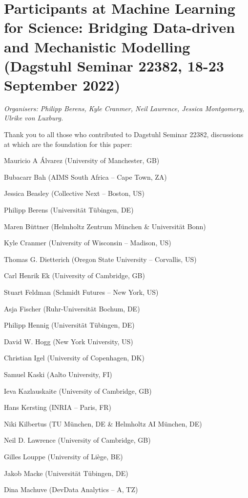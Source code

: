 \section{Participants at Machine Learning for Science: Bridging
Data-driven and Mechanistic Modelling (Dagstuhl Seminar 22382, 18-23
September
2022)}\label{annex-1-participants-at-machine-learning-for-science-bridging-data-driven-and-mechanistic-modelling-dagstuhl-seminar-22382-18-23-september-2022}

\emph{Organisers: Philipp Berens, Kyle Cranmer, Neil Lawrence, Jessica
Montgomery, Ulrike von Luxburg.}

Thank you to all those who contributed to Dagstuhl Seminar 22382,
discussions at which are the foundation for this paper:

Mauricio A Álvarez (University of Manchester, GB)

Bubacarr Bah (AIMS South Africa -- Cape Town, ZA)

Jessica Beasley (Collective Next -- Boston, US)

Philipp Berens (Universität Tübingen, DE)

Maren Büttner (Helmholtz Zentrum München \& Universität Bonn)

Kyle Cranmer (University of Wisconsin -- Madison, US)

Thomas G. Dietterich (Oregon State University -- Corvallis, US)

Carl Henrik Ek (University of Cambridge, GB)

Stuart Feldman (Schmidt Futures -- New York, US)

Asja Fischer (Ruhr-Universität Bochum, DE)

Philipp Hennig (Universität Tübingen, DE)

David W. Hogg (New York University, US)

Christian Igel (University of Copenhagen, DK)

Samuel Kaski (Aalto University, FI)

Ieva Kazlauskaite (University of Cambridge, GB)

Hans Kersting (INRIA -- Paris, FR)

Niki Kilbertus (TU München, DE \& Helmholtz AI München, DE)

Neil D. Lawrence (University of Cambridge, GB)

Gilles Louppe (University of Liège, BE)

Jakob Macke (Universität Tübingen, DE)

Dina Machuve (DevData Analytics -- A, TZ)

